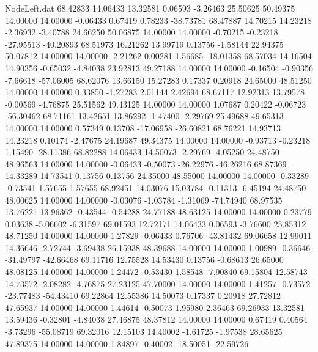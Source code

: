 \begin{filecontents}{NodeLeft.dat}
  68.42833   14.06433   13.32581     0.06593   -3.26463   25.50625   50.49375   14.00000   14.00000   -0.06433    0.67419    0.78233  -38.73781
  68.47887   14.70215   14.23218    -2.36932   -3.40788   24.66250   50.06875   14.00000   14.00000   -0.70215   -0.23218  -27.95513  -40.20893
  68.51973   16.21262   13.99719     0.13756   -1.58144   22.94375   50.07812   14.00000   14.00000   -2.21262    0.00281    1.56685  -18.01358
  68.57034   14.16504   14.90356    -0.65032   -4.84038   23.92813   49.27188   14.00000   14.00000   -0.16504   -0.90356   -7.66618  -57.06005
  68.62076   13.66150   15.27283     0.17337    0.20918   24.65000   48.51250   14.00000   14.00000    0.33850   -1.27283    2.01144    2.42694
  68.67117   12.92313   13.79578    -0.00569   -4.76875   25.51562   49.43125   14.00000   14.00000    1.07687    0.20422   -0.06723  -56.30462
  68.71161   13.42651   13.86292    -1.47400   -2.29769   25.49688   49.65313   14.00000   14.00000    0.57349    0.13708  -17.06958  -26.60821
  68.76221   14.93713   14.23218     0.10174   -2.47675   24.19687   49.34375   14.00000   14.00000   -0.93713   -0.23218    1.15490  -28.11386
  68.82288   14.06433   14.50073    -2.29769   -4.05250   24.48750   48.96563   14.00000   14.00000   -0.06433   -0.50073  -26.22976  -46.26216
  68.87369   14.33289   14.73541     0.13756    0.13756   24.35000   48.55000   14.00000   14.00000   -0.33289   -0.73541    1.57655    1.57655
  68.92451   14.03076   15.03784    -0.11313   -6.45194   24.48750   48.00625   14.00000   14.00000   -0.03076   -1.03784   -1.31069  -74.74940
  68.97535   13.76221   13.96362    -0.43544   -0.54288   24.77188   48.63125   14.00000   14.00000    0.23779    0.03638   -5.06602   -6.31597
  69.01593   12.72171   14.06433     0.06593   -3.76600   25.85312   48.71250   14.00000   14.00000    1.27829   -0.06433    0.76706  -43.81432
  69.06658   12.99011   14.36646    -2.72744   -3.69438   26.15938   48.39688   14.00000   14.00000    1.00989   -0.36646  -31.49797  -42.66468
  69.11716   12.75528   14.53430     0.13756   -0.68613   26.65000   48.08125   14.00000   14.00000    1.24472   -0.53430    1.58548   -7.90840
  69.15804   12.58743   14.73572    -2.08282   -4.76875   27.23125   47.70000   14.00000   14.00000    1.41257   -0.73572  -23.77483  -54.43410
  69.22864   12.55386   14.50073     0.17337    0.20918   27.72812   47.65937   14.00000   14.00000    1.44614   -0.50073    1.95980    2.36463
  69.26933   13.32581   13.59436    -0.32801   -4.84038   27.46875   48.37812   14.00000   14.00000    0.67419    0.40564   -3.73296  -55.08719
  69.32016   12.15103   14.40002    -1.61725   -1.97538   28.65625   47.89375   14.00000   14.00000    1.84897   -0.40002  -18.50051  -22.59726

\end{filecontents}
